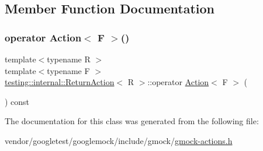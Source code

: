 \subsection{Member Function Documentation}
\mbox{\label{classtesting_1_1internal_1_1_return_action_a1aab69c4ea104e76e70ba209763f61d5}} 
\subsubsection{\texorpdfstring{operator Action$<$ F $>$()}{operator Action< F >()}}
{\footnotesize\ttfamily template$<$typename R $>$ \\
template$<$typename F $>$ \\
\hyperlink{classtesting_1_1internal_1_1_return_action}{testing\+::internal\+::\+Return\+Action}$<$ R $>$\+::operator \hyperlink{classtesting_1_1_action}{Action}$<$ F $>$ (\begin{DoxyParamCaption}{ }\end{DoxyParamCaption}) const\hspace{0.3cm}{\ttfamily [inline]}}



The documentation for this class was generated from the following file\+:\begin{DoxyCompactItemize}
\item 
vendor/googletest/googlemock/include/gmock/\hyperlink{gmock-actions_8h}{gmock-\/actions.\+h}\end{DoxyCompactItemize}
